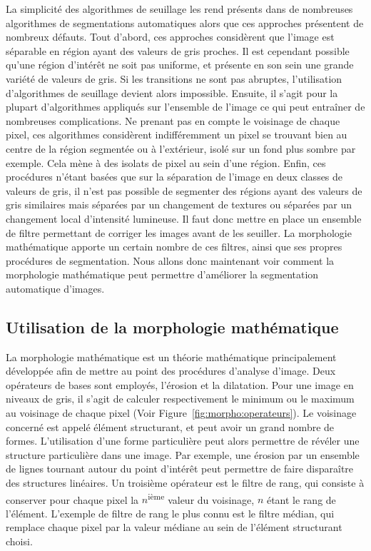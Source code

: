 \documentclass[\main/main.tex]{subfiles}
\begin{document}
%
La simplicité des algorithmes de seuillage les rend présents dans de nombreuses algorithmes de segmentations automatiques alors que  ces approches présentent de nombreux défauts.
%
Tout d'abord, ces approches considèrent que l'image est séparable en région ayant des valeurs de gris proches. Il est cependant possible qu'une région d'intérêt ne soit pas uniforme, et présente en son sein une grande variété de valeurs de gris. Si les transitions ne sont pas abruptes, l'utilisation d'algorithmes de seuillage devient alors impossible.
Ensuite, il s'agit pour la plupart d'algorithmes appliqués sur l'ensemble de l'image ce qui peut entraîner de nombreuses complications.
%
Ne prenant pas en compte le voisinage de chaque pixel, ces algorithmes considèrent indifféremment un pixel se trouvant bien au centre de la région segmentée ou à l'extérieur, isolé sur un fond plus sombre par exemple. Cela mène à des isolats de pixel au sein d'une région.
%
Enfin, ces procédures n'étant basées que sur la séparation de l'image en deux classes de valeurs de gris, il n'est pas possible de segmenter des régions ayant des valeurs de gris similaires mais séparées par un changement de textures ou séparées par un changement local d'intensité lumineuse.
Il faut donc mettre en place un ensemble de filtre permettant de corriger les images avant de les seuiller. La morphologie mathématique apporte un certain nombre de ces filtres, ainsi que ses propres procédures de segmentation.
%
Nous allons donc maintenant voir comment la morphologie mathématique peut permettre d'améliorer la segmentation automatique d'images.

    \subsection{Utilisation de la morphologie mathématique}
    
%
La morphologie mathématique est un théorie mathématique principalement développée afin de mettre au point des procédures d'analyse d'image.
%
Deux opérateurs de bases sont employés, l'érosion et la dilatation.
%
Pour une image en niveaux de gris, il s'agit de calculer respectivement le minimum ou le maximum au voisinage de chaque pixel (Voir Figure~\ref{fig:morpho:operateurs}).
%
Le voisinage concerné est appelé élément structurant, et peut avoir un grand nombre de formes.
%
L'utilisation d'une forme particulière peut alors permettre de révéler une structure particulière dans une image.
%
Par exemple, une érosion par un ensemble de lignes tournant autour du point d'intérêt peut permettre de faire disparaître des structures linéaires.
%
Un troisième opérateur est le filtre de rang, qui consiste à conserver pour chaque pixel la $n$\textsuperscript{ième} valeur du voisinage, $n$ étant le rang de l'élément.
%
L'exemple de filtre de rang le plus connu est le filtre médian, qui remplace chaque pixel par la valeur médiane au sein  de l'élément structurant choisi.
\end{document}
